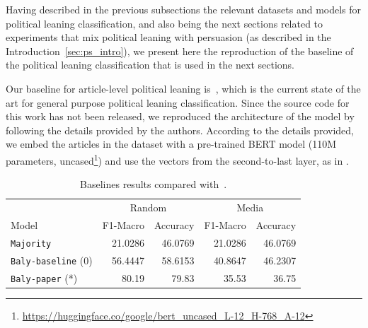 


Having described in the previous subsections the relevant datasets and models for political leaning classification, and also being the next sections related to experiments that mix political leaning with persuasion (as described in the Introduction~\ref{sec:ps_intro}),
we present here the reproduction of the baseline of the political leaning classification that is used in the next sections.

Our baseline for article-level political leaning is~\citet{baly2020we}, which is the current state of the art for general purpose political leaning classification.
Since the source code for this work has not been released, we reproduced the architecture of the model by following the details provided by the authors. %
According to the details provided, we embed the articles in the dataset with a pre-trained BERT model (110M parameters, uncased\footnote{\url{https://huggingface.co/google/bert_uncased_L-12_H-768_A-12}}) and use the vectors from the second-to-last layer, as in \citet{baly2020we}. %

\begin{table}[!htbp]
    \centering
    \scriptsize
    \begin{tabular}{l|rr|rr}
                                   & \multicolumn{2}{c}{Random} & \multicolumn{2}{c}{Media}                       \\
        Model                      & F1-Macro                   & Accuracy                  & F1-Macro & Accuracy \\
        \hline
        \texttt{Majority}          & 21.0286                    & 46.0769                   & 21.0286  & 46.0769  \\
        \texttt{Baly-baseline} (0) & 56.4447                    & 58.6153                   & 40.8647  & 46.2307  \\
        \texttt{Baly-paper} (*)    & 80.19                      & 79.83                     & 35.53    & 36.75    \\
    \end{tabular}
    \caption{Baselines results compared with~\citet{baly2020we}.}
    \label{tab:results_baselines_classifier}
\end{table}

